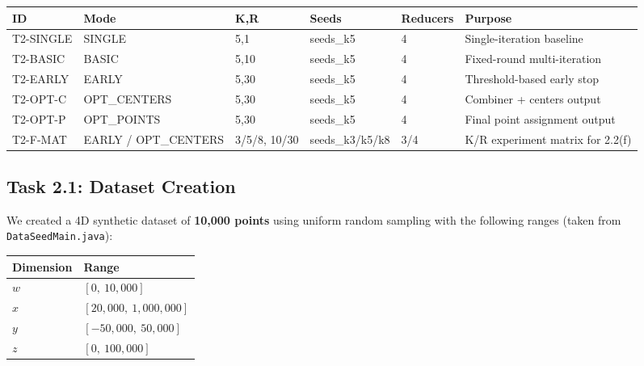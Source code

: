 \documentclass[11pt]{article}
\begin{document}
{\small
\begin{tabularx}{\linewidth}{@{}l l l l l Y@{}}
  \color{white}\textbf{ID} &
  \color{white}\textbf{Mode} &
  \color{white}\textbf{K,R} &
  \color{white}\textbf{Seeds} &
  \color{white}\textbf{Reducers} &
  \color{white}\textbf{Purpose} \\
  \midrule
  T2-SINGLE  & SINGLE      & 5,1       & seeds\_k5       & 4   & Single-iteration baseline \\
  T2-BASIC   & BASIC       & 5,10      & seeds\_k5       & 4   & Fixed-round multi-iteration \\
  T2-EARLY   & EARLY       & 5,30      & seeds\_k5       & 4   & Threshold-based early stop \\
  T2-OPT-C   & OPT\_CENTERS & 5,30     & seeds\_k5       & 4   & Combiner + centers output \\
  T2-OPT-P   & OPT\_POINTS  & 5,30     & seeds\_k5       & 4   & Final point assignment output \\
  T2-F-MAT   & EARLY / OPT\_CENTERS & 3/5/8, 10/30 & seeds\_k3/k5/k8 & 3/4 & K/R experiment matrix for 2.2(f) \\
\end{tabularx}
}

\subsection{Task 2.1: Dataset Creation}

We created a 4D synthetic dataset of \textbf{10,000 points} using uniform random sampling with the following ranges (taken from \texttt{DataSeedMain.java}):

\begin{center}
\begin{tabular}{@{}ll@{}}
  \rowcolor{tableheader}
  \color{white}\textbf{Dimension} & \color{white}\textbf{Range} \\
  \midrule
  $w$ & $[0,\ 10{,}000]$ \\
  \rowcolor{tablealt}
  $x$ & $[20{,}000,\ 1{,}000{,}000]$ \\
  $y$ & $[-50{,}000,\ 50{,}000]$ \\
  \rowcolor{tablealt}
  $z$ & $[0,\ 100{,}000]$ \\
\end{tabular}
\end{center}
\end{document}
